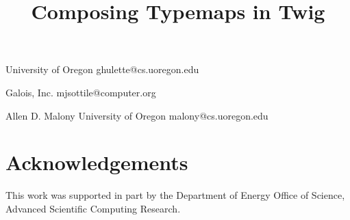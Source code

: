 \documentclass[10pt]{sigplanconf}
\begin{document}
\title{Composing Typemaps in Twig}

  {University of Oregon}
  {ghulette@cs.uoregon.edu}

  {Galois, Inc.}
  {mjsottile@computer.org}

\authorinfo
  {Allen D. Malony}
  {University of Oregon}
  {malony@cs.uoregon.edu}

\maketitle









\section{Acknowledgements}

This work was supported in part by the Department of Energy Office of Science, Advanced Scientific Computing Research.



\end{document}
